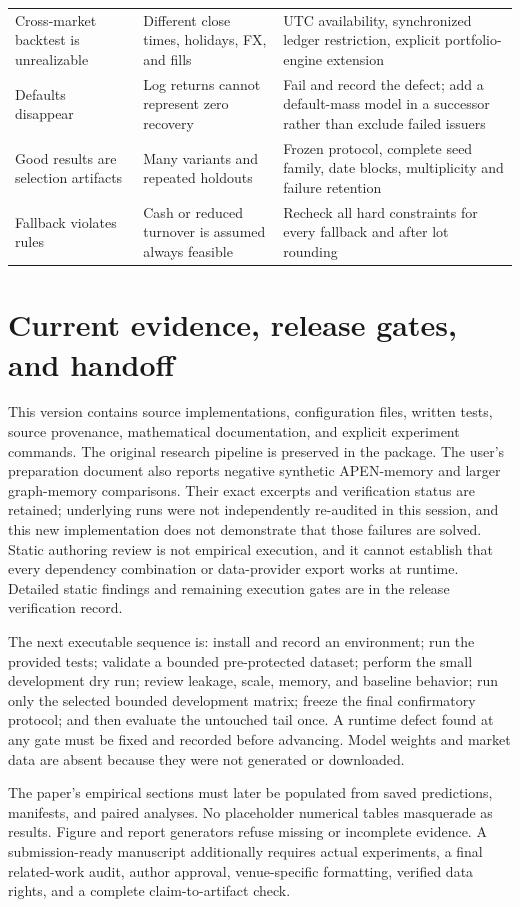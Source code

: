 \documentclass[11pt,a4paper]{article}
\begin{document}
\begin{longtable}{>{\raggedright\arraybackslash}p{.23\linewidth}>{\raggedright\arraybackslash}p{.31\linewidth}>{\raggedright\arraybackslash}p{.37\linewidth}}
Cross-market backtest is unrealizable & Different close times, holidays, FX, and fills & UTC availability, synchronized ledger restriction, explicit portfolio-engine extension \\
Defaults disappear & Log returns cannot represent zero recovery & Fail and record the defect; add a default-mass model in a successor rather than exclude failed issuers \\
Good results are selection artifacts & Many variants and repeated holdouts & Frozen protocol, complete seed family, date blocks, multiplicity and failure retention \\
Fallback violates rules & Cash or reduced turnover is assumed always feasible & Recheck all hard constraints for every fallback and after lot rounding \\
\bottomrule
\end{longtable}

\section{Current evidence, release gates, and handoff}

This version contains source implementations, configuration files, written tests, source provenance, mathematical documentation, and explicit experiment commands. The original research pipeline is preserved in the package. The user's preparation document also reports negative synthetic APEN-memory and larger graph-memory comparisons. Their exact excerpts and verification status are retained; underlying runs were not independently re-audited in this session, and this new implementation does not demonstrate that those failures are solved. Static authoring review is not empirical execution, and it cannot establish that every dependency combination or data-provider export works at runtime. Detailed static findings and remaining execution gates are in the release verification record.

The next executable sequence is: install and record an environment; run the provided tests; validate a bounded pre-protected dataset; perform the small development dry run; review leakage, scale, memory, and baseline behavior; run only the selected bounded development matrix; freeze the final confirmatory protocol; and then evaluate the untouched tail once. A runtime defect found at any gate must be fixed and recorded before advancing. Model weights and market data are absent because they were not generated or downloaded.

The paper's empirical sections must later be populated from saved predictions, manifests, and paired analyses. No placeholder numerical tables masquerade as results. Figure and report generators refuse missing or incomplete evidence. A submission-ready manuscript additionally requires actual experiments, a final related-work audit, author approval, venue-specific formatting, verified data rights, and a complete claim-to-artifact check.
\end{document}

